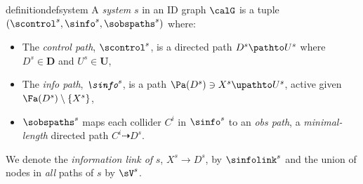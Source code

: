 








\begin{restatable}[System]{definition}{defsystem} \label{def:system-minimal}
A \emph{system} $s$ in an ID graph $\calG$ %
is a tuple $(\scontrol^s, \sinfo^s, \sobspaths^s)$ where: 
\begin{itemize}
    \item 
    The \emph{control path}, $\scontrol^s$, is a directed path $D^s \pathto U^s$ where $D^s \in \bm{D}$ and $U^s\in \bm{U}$,
    \item The \emph{info path}, $\emph{$\sinfo^s$}$, is a path $\Pa(D^s)\ni X^s\upathto U^s$, active given $\Fa(D^s) \setminus \{X^s\}$,
    \item $\sobspaths^s$ maps each collider $C^i$ in $\sinfo^s$ to
    an \emph{obs path}, a \emph{minimal-length} directed path $C^i \!\!\dashrightarrow\! D^s$.~
\end{itemize}


We denote the \emph{information link of} $s$, $X^s \!\to\! D^s$, by
$\sinfolink^s$ and the union of nodes in \emph{all} paths of $s$ 
by $\sV^s$.
\end{restatable}



